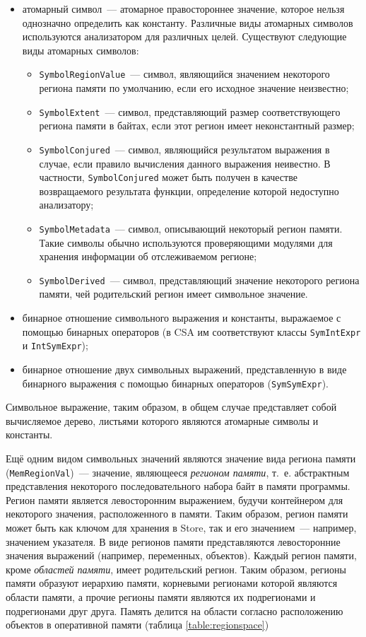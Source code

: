 \begin{itemize}
 \item атомарный символ~--- атомарное правостороннее значение, которое нельзя однозначно определить как константу. Различные виды атомарных символов используются анализатором для различных целей. Существуют следующие виды атомарных символов:
 \begin{itemize}
 \item \texttt{SymbolRegionValue}~--- символ, являющийся значением некоторого региона памяти по умолчанию, если его исходное значение неизвестно;
 \item \texttt{SymbolExtent}~--- символ, представляющий размер соответствующего региона памяти в байтах, если этот регион имеет неконстантный размер;
 \item \texttt{SymbolConjured}~--- символ, являющийся результатом выражения в случае, если правило вычисления данного выражения неивестно. В частности, \texttt{SymbolConjured} может быть получен в качестве возвращаемого результата функции, определение которой недоступно анализатору;
 \item \texttt{SymbolMetadata}~--- символ, описывающий некоторый регион памяти. Такие символы обычно используются проверяющими модулями для хранения информации об отслеживаемом регионе;
 \item \texttt{SymbolDerived}~--- символ, представляющий значение некоторого региона памяти, чей родительский регион имеет символьное значение.
 \end{itemize}

 \item бинарное отношение символьного выражения и константы, выражаемое с помощью бинарных операторов (в CSA им соответствуют классы \texttt{SymIntExpr} и \texttt{IntSymExpr});
 \item бинарное отношение двух символьных выражений, представленную в виде бинарного выражения с помощью бинарных операторов (\texttt{SymSymExpr}).
\end{itemize}

Символьное выражение, таким образом, в общем случае представляет собой вычисляемое дерево, листьями которого являются атомарные символы и константы.

Ещё одним видом символьных значений являются значение вида региона памяти (\texttt{MemRegionVal})~--- значение, являющееся \textit{регионом памяти}, т.~е. абстрактным представления некоторого последовательного набора байт в памяти программы. Регион памяти является левосторонним выражением, будучи контейнером для некоторого значения, расположенного в памяти. Таким образом, регион памяти может быть как ключом для хранения в Store, так и его значением~--- например, значением указателя. В виде регионов памяти представляются левосторонние значения выражений (например, переменных, объектов). Каждый регион памяти, кроме \textit{областей памяти}, имеет родительский регион. Таким образом, регионы памяти образуют иерархию памяти, корневыми регионами которой являются области памяти, а прочие регионы памяти являются их подрегионами и подрегионами друг друга. Память делится на области согласно расположению объектов в оперативной памяти (таблица \ref{table:regionspace})

